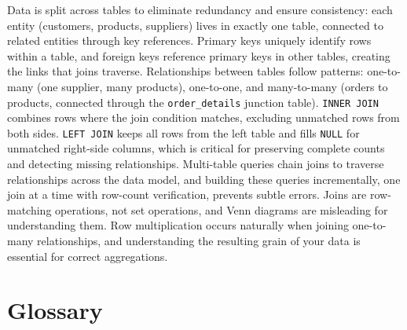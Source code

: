 \documentclass[
  letterpaper,
  DIV=11,
  numbers=noendperiod]{scrreprt}
\begin{document}
Data is split across tables to eliminate redundancy and ensure
consistency: each entity (customers, products, suppliers) lives in
exactly one table, connected to related entities through key references.
Primary keys uniquely identify rows within a table, and foreign keys
reference primary keys in other tables, creating the links that joins
traverse. Relationships between tables follow patterns: one-to-many (one
supplier, many products), one-to-one, and many-to-many (orders to
products, connected through the \texttt{order\_details} junction table).
\texttt{INNER\ JOIN} combines rows where the join condition matches,
excluding unmatched rows from both sides. \texttt{LEFT\ JOIN} keeps all
rows from the left table and fills \texttt{NULL} for unmatched
right-side columns, which is critical for preserving complete counts and
detecting missing relationships. Multi-table queries chain joins to
traverse relationships across the data model, and building these queries
incrementally, one join at a time with row-count verification, prevents
subtle errors. Joins are row-matching operations, not set operations,
and Venn diagrams are misleading for understanding them. Row
multiplication occurs naturally when joining one-to-many relationships,
and understanding the resulting grain of your data is essential for
correct aggregations.

\section{Glossary}\label{glossary-7}
\end{document}
